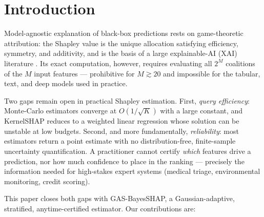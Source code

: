 \documentclass[preprint,12pt]{elsarticle}
\begin{document}
\section{Introduction}\label{sec:intro}

Model-agnostic explanation of black-box predictions rests on game-theoretic attribution: the Shapley value \cite{shapley1953} is the unique allocation satisfying efficiency, symmetry, and additivity, and is the basis of a large explainable-AI (XAI) literature \cite{lundberg2017,castro2009,covert2021}. Its exact computation, however, requires evaluating all $2^M$ coalitions of the $M$ input features --- prohibitive for $M\gtrsim20$ and impossible for the tabular, text, and deep models used in practice.

Two gaps remain open in practical Shapley estimation. First, \emph{query efficiency}: Monte-Carlo estimators \cite{castro2009} converge at $O(1/\sqrt K)$ with a large constant, and KernelSHAP \cite{lundberg2017} reduces to a weighted linear regression whose solution can be unstable at low budgets. Second, and more fundamentally, \emph{reliability}: most estimators return a point estimate with no distribution-free, finite-sample uncertainty quantification. A practitioner cannot certify \emph{which} features drive a prediction, nor how much confidence to place in the ranking --- precisely the information needed for high-stakes expert systems (medical triage, environmental monitoring, credit scoring).

This paper closes both gaps with GAS-BayesSHAP, a Gaussian-adaptive, stratified, anytime-certified estimator. Our contributions are:
\end{document}
